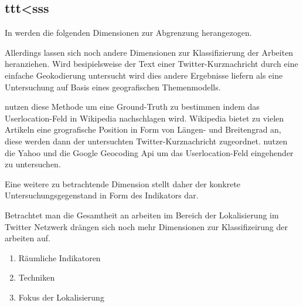 		\subsection{ttt<sss}
		In \cite{Schulz2013} werden die folgenden Dimensionen zur Abgrenzung herangezogen.


		Allerdings lassen sich noch andere Dimensionen zur Klassifizierung der Arbeiten heranziehen. 
		Wird besipielsweise der Text einer Twitter-Kurznachricht durch eine einfache Geokodierung untersucht wird dies andere Ergebnisse liefern als eine Untersuchung auf Basis eines geografischen Themenmodells.  
		

		\cite{Hecht2011} nutzen diese Methode um eine Ground-Truth zu bestimmen indem das Userlocation-Feld in Wikipedia nachschlagen wird. Wikipedia bietet zu vielen Artikeln eine grografische Position in Form von Längen- und Breitengrad an, diese werden dann der untersuchten Twitter-Kurznachricht zugeordnet. 
		\cite{Hale2012} nutzen die Yahoo und die Google Geocoding Api um das Userlocation-Feld eingehender zu untersuchen.  
		

		
		Eine weitere zu betrachtende Dimension stellt daher der konkrete Untersuchungsgegenstand in Form des Indikators dar.


		Betrachtet man die Gesamtheit an arbeiten im Bereich der Lokalisierung im Twitter Netzwerk drängen sich noch mehr Dimensionen zur Klassifizeirung der arbeiten auf.

		\begin{enumerate}
		 	\item Räumliche Indikatoren
		 	\item Techniken
		 	\item Fokus der Lokalisierung
		 \end{enumerate} 	



		

